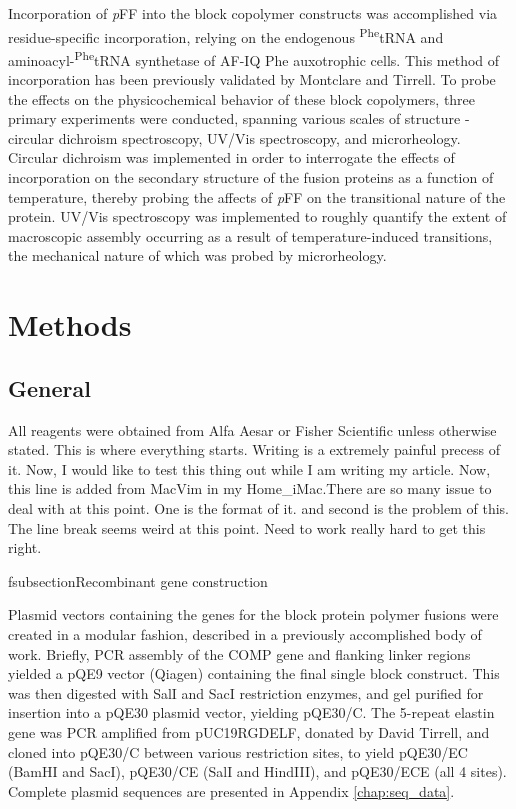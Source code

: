 \begin{refsection}
Incorporation of \emph{p}FF into the block copolymer constructs was accomplished
via residue-specific incorporation, relying on the endogenous
\textsuperscript{Phe}tRNA and aminoacyl-\textsuperscript{Phe}tRNA synthetase of
AF-IQ Phe auxotrophic cells. This method of incorporation has been previously
validated by Montclare and
Tirrell.\cite{Voloshchuk2009,Panchenko2006,Baker2011,Sharma2000,Yoshikawa1994}
To probe the effects on the physicochemical behavior of these block copolymers,
three primary experiments were conducted, spanning various scales of structure -
circular dichroism spectroscopy, UV/Vis spectroscopy, and microrheology.
Circular dichroism was implemented in order to interrogate the effects of
incorporation on the secondary structure of the fusion proteins as a function of
temperature, thereby probing the affects of \emph{p}FF on the transitional
nature of the protein. UV/Vis spectroscopy was implemented to roughly quantify
the extent of macroscopic assembly occurring as a result of temperature-induced
transitions, the mechanical nature of which was probed by microrheology. 

\section{Methods}

\subsection{General}

All reagents were obtained from Alfa Aesar or Fisher
Scientific unless otherwise stated. This is where everything starts. Writing is
a extremely painful precess of it. Now, I would like to test this thing out
while I am writing my article. Now, this line is added from MacVim in my
Home\_iMac.There are so many issue to deal with at this point. One is the
format of it. and second is the problem of this. The line break seems weird at
this point. Need to work really hard to get this right.

fsubsection{Recombinant gene construction}

Plasmid vectors containing the genes for the block protein polymer fusions were
created in a modular fashion, described in a previously accomplished body of
work.\cite{Haghpanah2009} Briefly, PCR assembly of the COMP gene and flanking
linker regions yielded a pQE9 vector (Qiagen) containing the final single block
construct.\cite{Kwon2003} This was then digested with SalI and SacI restriction
enzymes, and gel purified for insertion into a pQE30 plasmid vector, yielding
pQE30/C. The 5-repeat elastin gene was PCR amplified from pUC19RGDELF, donated
by David Tirrell, and cloned into pQE30/C between various restriction sites, to
yield pQE30/EC (BamHI and SacI), pQE30/CE (SalI and HindIII), and pQE30/ECE
(all 4 sites). Complete plasmid sequences are presented in Appendix
\ref{chap:seq_data}. 


\end{refsection}

